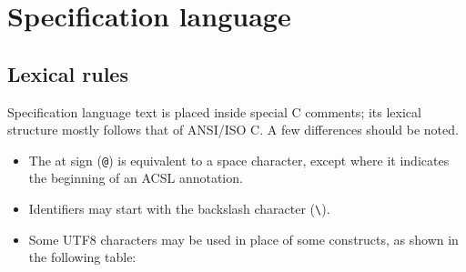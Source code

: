
\chapter{Specification language}
\label{chap:base}

\section{Lexical rules}
\label{sec:lexicalrules}

Specification language text is placed inside special C comments; 
its lexical structure mostly follows that of ANSI/ISO C. A few differences
should be noted.
\begin{itemize}
\item The at sign (\verb|@|) is equivalent
  to a space character, except where it indicates the beginning of an ACSL annotation.
\item Identifiers may start with the backslash character (\verb|\|).
\item Some UTF8 characters may be used in place of some constructs, as
  shown in the following table:


\end{itemize}
